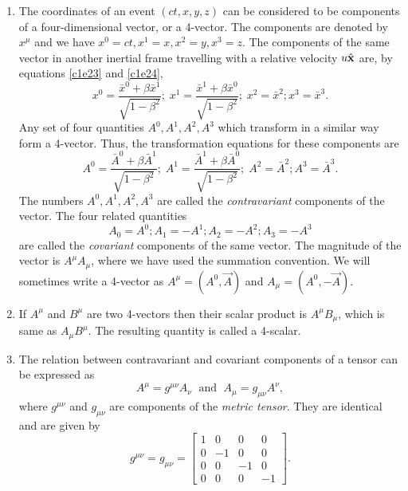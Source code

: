 \begin{enumerate}
\item The coordinates of an event $(ct, x, y, z)$ can be considered to be
components of a four-dimensional vector, or a 4-vector. The components are
denoted by $x^\mu$ and we have $x^0 = ct, x^1 = x, x^2 = y, x^3 = z$. The 
components of the same vector in another inertial frame travelling with a 
relative velocity $u\hat{\mathbf{x}}$ are, by equations \eqref{c1e23} and \eqref{c1e24},
\[
x^0 = \frac{\bar{x}^0 + \beta\bar{x}^1}{\sqrt{1 - \beta^2}};\;
x^1 = \frac{\bar{x}^1 + \beta\bar{x}^0}{\sqrt{1 - \beta^2}};\;
x^2 = \bar{x}^2; x^3 = \bar{x}^3.
\]
Any set of four quantities $A^0, A^1, A^2, A^3$ which transform in a similar
way form a 4-vector. Thus, the transformation equations for these components
are
\begin{equation}\label{c1e46}
A^0 = \frac{\bar{A}^0 + \beta\bar{A}^1}{\sqrt{1 - \beta^2}};\;
A^1 = \frac{\bar{A}^1 + \beta\bar{A}^0}{\sqrt{1 - \beta^2}};\;
A^2 = \bar{A}^2; A^3 = \bar{A}^3.
\end{equation}
The numbers $A^0, A^1, A^2, A^3$ are called the \emph{contravariant} components
of the vector. The four related quantities
\begin{equation}\label{c1e47}
A_0 = A^0; A_1 = -A^1; A_2 = -A^2; A_3 = -A^3
\end{equation}
are called the \emph{covariant} components of the same vector. The magnitude of
the vector is $A^\mu A_\mu$, where we have used the summation convention. We will 
sometimes write a 4-vector as $A^\mu = (A^0, \vec{A})$ and $A_\mu = (A^0, -\vec{A})$.

\item If $A^\mu$ and $B^\mu$ are two 4-vectors then their scalar product is $A^\mu 
B_\mu$, which is same as $A_\mu B^\mu$. The resulting quantity is called a 4-scalar. 

\item The relation between contravariant and covariant components of a tensor
can be expressed as
\begin{equation}\label{c1e48}
A^\mu = g^{\mu\nu}A_\nu\;\text{ and }\; A_\mu = g_{\mu\nu}A^\nu,
\end{equation}
where $g^{\mu\nu}$ and $g_{\mu\nu}$ are components of the \emph{metric tensor}. 
They are identical and are given by
\begin{equation}\label{c1e49}
g^{\mu\nu} = g_{\mu\nu} = \begin{bmatrix}1 & 0 & 0 & 0 \\
0 & -1 & 0 & 0 \\
0 & 0 & -1 & 0 \\
0 & 0 & 0 & -1
\end{bmatrix}.
\end{equation}


\end{enumerate}
